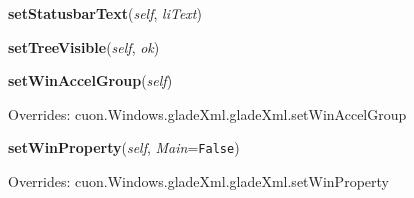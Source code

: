     \label{cuon:Windows:windows:windows:setStatusbarText}

    \vspace{0.5ex}

\hspace{.8\funcindent}\begin{boxedminipage}{\funcwidth}

    \raggedright \textbf{setStatusbarText}(\textit{self}, \textit{liText})

\setlength{\parskip}{2ex}
\setlength{\parskip}{1ex}
    \end{boxedminipage}

    \label{cuon:Windows:windows:windows:setTreeVisible}

    \vspace{0.5ex}

\hspace{.8\funcindent}\begin{boxedminipage}{\funcwidth}

    \raggedright \textbf{setTreeVisible}(\textit{self}, \textit{ok})

\setlength{\parskip}{2ex}
\setlength{\parskip}{1ex}
    \end{boxedminipage}

    \vspace{0.5ex}

\hspace{.8\funcindent}\begin{boxedminipage}{\funcwidth}

    \raggedright \textbf{setWinAccelGroup}(\textit{self})

\setlength{\parskip}{2ex}
\setlength{\parskip}{1ex}
      Overrides: cuon.Windows.gladeXml.gladeXml.setWinAccelGroup

    \end{boxedminipage}

    \vspace{0.5ex}

\hspace{.8\funcindent}\begin{boxedminipage}{\funcwidth}

    \raggedright \textbf{setWinProperty}(\textit{self}, \textit{Main}={\tt False})

\setlength{\parskip}{2ex}
\setlength{\parskip}{1ex}
      Overrides: cuon.Windows.gladeXml.gladeXml.setWinProperty

    \end{boxedminipage}

